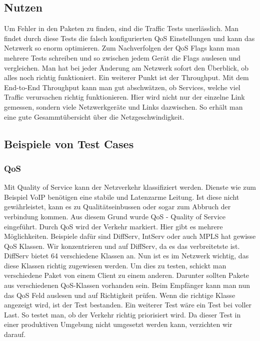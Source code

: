 \documentclass[a4,12pt]{scrartcl}
\begin{document}
\subsection{Nutzen}
Um Fehler in den Paketen zu finden, sind die Traffic Tests unerlässlich. Man findet durch diese Tests die falsch konfigurierten QoS Einstellungen und kann das Netzwerk so enorm optimieren. \newline
Zum Nachverfolgen der QoS Flags kann man mehrere Tests schreiben und so zwischen jedem Gerät die Flags auslesen und vergleichen.\newline\newline\newline
Man hat bei jeder Änderung am Netzwerk sofort den Überblick, ob alles noch richtig funktioniert.\newline\newline
Ein weiterer Punkt ist der Throughput. Mit dem End-to-End Throughput kann man gut abschwätzen, ob Services, welche viel Traffic verursachen richtig funktionieren. Hier wird nicht nur der einzelne Link gemessen, sondern viele Netzwerkgeräte und Links dazwischen. So erhält man eine gute Gesammtübersicht über die Netzgeschwindigkeit.

\subsection{Beispiele von Test Cases}
\subsubsection{QoS}
Mit Quality of Service kann der Netzverkehr klassifiziert werden. Dienste wie zum Beispiel VoIP benötigen eine stabile und Latenzarme Leitung. Ist diese nicht gewährleistet, kann es zu Qualitätseinbussen oder sogar zum Abbruch der verbindung kommen. Aus diesem Grund wurde QoS - Quality of Service eingeführt. Durch QoS wird der Verkehr markiert. Hier gibt es mehrere Möglichkeiten. Beispiele dafür sind DiffServ, IntServ oder auch MPLS hat gewisse QoS Klassen. Wir konzentrieren und auf DiffServ, da es das verbreitetste ist.\newline\newline
DiffServ bietet 64 verschiedene Klassen an. Nun ist es im Netzwerk wichtig, das diese Klassen richtig zugewiesen werden. Um dies zu testen, schickt man verschiedene Paket von einem Client zu einem anderen. Darunter sollten Pakete aus verschiedenen QoS-Klassen vorhanden sein. Beim Empfänger kann man nun das QoS Feld auslesen und auf Richtigkeit prüfen. Wenn die richtige Klasse angezeigt wird, ist der Test bestanden.\newline
Ein weiterer Test wäre ein Test bei voller Last. So testet man, ob der Verkehr richtig priorisiert wird. Da dieser Test in einer produktiven Umgebung nicht umgesetzt werden kann, verzichten wir darauf.
\end{document}
